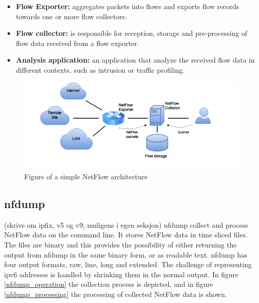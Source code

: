 \begin{itemize}
\item \textbf{Flow Exporter:} aggregates packets into flows and exports flow records towards one or more flow collectors. 

\item \textbf{Flow collector:} is responsible for reception, storage and pre-processing of flow data received from a flow exporter.

\item \textbf{Analysis application:} an application that analyze the received flow data in different contexts, such as intrusion or traffic profiling.
\end{itemize}

\begin{figure}[h!]
\includegraphics[scale=0.5]{netflow_arch}
\caption{Figure of a simple NetFlow architecture}
\end{figure}

\subsection{nfdump}
\todo(skrive om ipfix, v5 og v9, muligens i egen seksjon)
nfdump collect and process NetFlow data on the command line. It stores NetFlow data in time sliced files. The files are binary and this provides the possibility of either returning the output from nfdump in the same binary form, or as readable text. nfdump has four output formats, raw, line, long and extended. 
The challenge of representing \gls{ipv6} addresses is handled by shrinking them in the normal output. 
In figure \ref{nfdump_operation} the collection process is depicted, and in figure \ref{nfdump_processing} the processing of collected NetFlow data is shown.\citep{nfdump}

